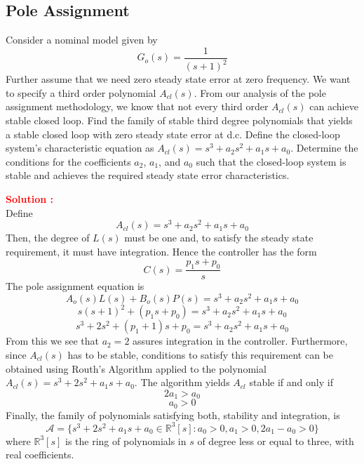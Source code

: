 \documentclass[12pt]{article}
\begin{document}
\clearpage
\subsection{Pole Assignment}

Consider a nominal model given by
\begin{equation}
G_o(s) = \frac{1}{(s + 1)^2}
\end{equation}
Further assume that we need zero steady state error at zero frequency. We want to specify a third order polynomial $A_{cl}(s)$. From our analysis of the pole assignment methodology, we know that not every third order $A_{cl}(s)$ can achieve stable closed loop. Find the family of stable third degree polynomials that yields a stable closed loop with zero steady state error at d.c. Define the closed-loop system's characteristic equation as \(A_{cl}(s) = s^3 + a_2s^2 + a_1s + a_0\). Determine the conditions for the coefficients \(a_2\), \(a_1\), and \(a_0\) such that the closed-loop system is stable and achieves the required steady state error characteristics.

\textbf{\textcolor{red}{Solution :}}\\
Define
\begin{equation}
A_{cl}(s) = s^3 + a_2s^2 + a_1s + a_0
\end{equation}
Then, the degree of $L(s)$ must be one and, to satisfy the steady state requirement, it must have integration. Hence the controller has the form
\begin{equation}
C(s) = \frac{p_1s + p_0}{s}
\end{equation}
The pole assignment equation is
\begin{equation}
A_o(s)L(s) + B_o(s)P(s) = s^3 + a_2s^2 + a_1s + a_0
\end{equation}
\begin{equation}
s(s + 1)^2 + (p_1s + p_0) = s^3 + a_2s^2 + a_1s + a_0
\end{equation}
\begin{equation}
s^3 + 2s^2 + (p_1 + 1)s + p_0 = s^3 + a_2s^2 + a_1s + a_0
\end{equation}
From this we see that $a_2 = 2$ assures integration in the controller. Furthermore, since $A_{cl}(s)$ has to be stable, conditions to satisfy this requirement can be obtained using Routh's Algorithm applied to the polynomial $A_{cl}(s) = s^3 + 2s^2 + a_1s + a_0$. The algorithm yields $A_{cl}$ stable if and only if
\begin{equation}
2a_1 > a_0
\end{equation}
\begin{equation}
a_0 > 0
\end{equation}
Finally, the family of polynomials satisfying both, stability and integration, is
\begin{equation}
\mathcal{A} = \{s^3 + 2s^2 + a_1s + a_0 \in \mathbb{R}^3[s] : a_0 > 0, a_1 > 0, 2a_1 - a_0 > 0\}
\end{equation}
where $\mathbb{R}^3[s]$ is the ring of polynomials in $s$ of degree less or equal to three, with real coefficients.
\end{document}
